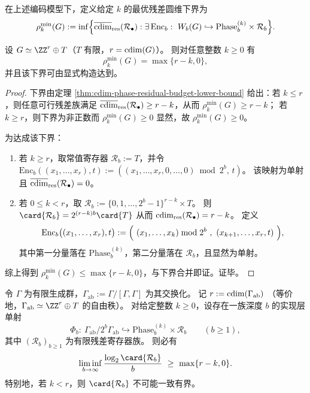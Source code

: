 \begin{definition}[最优残差圆维下界]\label{def:cdim-min-residual-budget}
在上述编码模型下，定义给定 \(k\) 的最优残差圆维下界为
\[
\rho_k^{\min}(G)
:=\inf\Bigl\{\overline{\operatorname{cdim}}_{\mathrm{res}}(\mathcal{R}_\bullet):
\exists\,\mathrm{Enc}_b:\ W_b(G)\hookrightarrow \mathrm{Phase}_b^{(k)}\times \mathcal{R}_b\Bigr\}.
\]
\end{definition}

\begin{theorem}[圆维预算区域的完备刻画与可达性]\label{thm:cdim-budget-completeness}
设 \(G\simeq \ZZ^r\oplus T\)（\(T\) 有限，\(r=\operatorname{cdim}(G)\)）。
则对任意整数 \(k\ge 0\) 有
\[
\rho_k^{\min}(G)=\max\{r-k,0\},
\]
并且该下界可由显式构造达到。
\end{theorem}
\begin{proof}
下界由定理 \ref{thm:cdim-phase-residual-budget-lower-bound} 给出：若 \(k\le r\)，则任意可行残差族满足
\(\overline{\operatorname{cdim}}_{\mathrm{res}}(\mathcal{R}_\bullet)\ge r-k\)，从而 \(\rho_k^{\min}(G)\ge r-k\)；
若 \(k\ge r\)，则下界为非正数而 \(\rho_k^{\min}(G)\ge 0\) 显然，故 \(\rho_k^{\min}(G)\ge 0\)。
\par
为达成该下界：
\begin{enumerate}
  \item 若 \(k\ge r\)，取常值寄存器 \(\mathcal{R}_b:=T\)，并令
  \(
  \mathrm{Enc}_b((x_1,\dots,x_r),t):=((x_1,\dots,x_r,0,\dots,0)\bmod 2^b,\,t)
  \)。
  该映射为单射且 \(\overline{\operatorname{cdim}}_{\mathrm{res}}(\mathcal{R}_\bullet)=0\)。
  \item 若 \(0\le k<r\)，取
  \(
  \mathcal{R}_b:=\{0,1,\dots,2^b-1\}^{r-k}\times T
  \)。
  则 \(\card{\mathcal{R}_b}=2^{(r-k)b}\card{T}\) 从而 \(\operatorname{cdim}_{\mathrm{res}}(\mathcal{R}_\bullet)=r-k\)。
  定义
  \[
  \mathrm{Enc}_b\bigl((x_1,\dots,x_r),t\bigr)
  :=
  \Bigl(\ (x_1,\dots,x_k)\bmod 2^b\ ,\ (x_{k+1},\dots,x_r,t)\ \Bigr),
  \]
  其中第一分量落在 \(\mathrm{Phase}_b^{(k)}\)，第二分量落在 \(\mathcal{R}_b\)，且显然为单射。
\end{enumerate}
综上得到 \(\rho_k^{\min}(G)\le \max\{r-k,0\}\)，与下界合并即证。证毕。
\end{proof}

\begin{corollary}[非交换系统的交换化圆维瓶颈]\label{cor:cdim-abelianization-bottleneck}
令 \(\Gamma\) 为有限生成群，\(\Gamma_{\mathrm{ab}}:=\Gamma/[\Gamma,\Gamma]\) 为其交换化。
记
\(
r:=\operatorname{cdim}(\Gamma_{\mathrm{ab}})
\)
（等价地，\(\Gamma_{\mathrm{ab}}\simeq \ZZ^r\oplus T\) 的自由秩）。
对给定整数 \(k\ge 0\)，设存在一族深度 \(b\) 的实现层单射
\[
\Phi_b:\ \Gamma_{\mathrm{ab}}/2^b\Gamma_{\mathrm{ab}}\hookrightarrow \mathrm{Phase}_b^{(k)}\times \mathcal{R}_b
\qquad(b\ge 1),
\]
其中 \((\mathcal{R}_b)_{b\ge 1}\) 为有限残差寄存器族。
则必有
\[
\liminf_{b\to\infty}\frac{\log_2\card{\mathcal{R}_b}}{b}
\ \ge\
\max\{r-k,0\}.
\]
特别地，若 \(k<r\)，则 \(\card{\mathcal{R}_b}\) 不可能一致有界。
\end{corollary}

